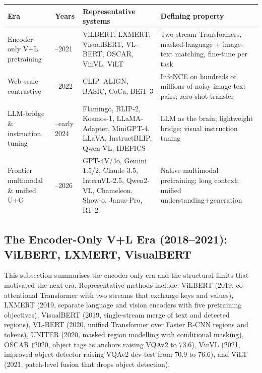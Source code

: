 {\def\LTcaptype{none} %
\begin{longtable}[]{@{}
  >{\raggedright\arraybackslash}p{}
  >{\raggedright\arraybackslash}p{}
  >{\raggedright\arraybackslash}p{}
  >{\raggedright\arraybackslash}p{}@{}}
\toprule\noalign{}
\begin{minipage}[b]{\linewidth}\raggedright
\textbf{Era}
\end{minipage} & \begin{minipage}[b]{\linewidth}\raggedright
\textbf{Years}
\end{minipage} & \begin{minipage}[b]{\linewidth}\raggedright
\textbf{Representative systems}
\end{minipage} & \begin{minipage}[b]{\linewidth}\raggedright
\textbf{Defining property}
\end{minipage} \\
\midrule\noalign{}
\endhead
\bottomrule\noalign{}
\endlastfoot
Encoder-only V+L pretraining & 2018--2021 & ViLBERT, LXMERT, VisualBERT, VL-BERT, OSCAR, VinVL, ViLT & Two-stream Transformers, masked-language + image-text matching, fine-tune per task \\
Web-scale contrastive & 2021--2022 & CLIP, ALIGN, BASIC, CoCa, BEiT-3 & InfoNCE on hundreds of millions of noisy image-text pairs; zero-shot transfer \\
LLM-bridge \& instruction tuning & 2022--early 2024 & Flamingo, BLIP-2, Kosmos-1, LLaMA-Adapter, MiniGPT-4, LLaVA, InstructBLIP, Qwen-VL, IDEFICS & LLM as the brain; lightweight bridge; visual instruction tuning \\
Frontier multimodal \& unified U+G & 2024--2026 & GPT-4V/4o, Gemini 1.5/2, Claude 3.5, InternVL-2.5, Qwen2-VL, Chameleon, Show-o, Janus-Pro, RT-2 & Native multimodal pretraining; long context; unified understanding+generation \\
\end{longtable}
}

\subsection{The Encoder-Only V+L Era (2018--2021): ViLBERT, LXMERT, VisualBERT}\label{the-encoder-only-vl-era-20182021-vilbert-lxmert-visualbert}

This subsection summarises the encoder-only era and the structural limits that motivated the next era. Representative methods include: ViLBERT (2019, co-attentional Transformer with two streams that exchange keys and values), LXMERT (2019, separate language and vision encoders with five pretraining objectives), VisualBERT (2019, single-stream merge of text and detected regions), VL-BERT (2020, unified Transformer over Faster R-CNN regions and tokens), UNITER (2020, masked region modelling with conditional masking), OSCAR (2020, object tags as anchors raising VQAv2 to 73.6), VinVL (2021, improved object detector raising VQAv2 dev-test from 70.9 to 76.6), and ViLT (2021, patch-level fusion that drops object detection).

